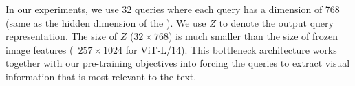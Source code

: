 In our experiments,
we use 32 queries where each query has a dimension of 768 (same as the hidden dimension of the \name).
We use $Z$ to denote the output query representation.
The size of $Z$ ($32\times768$) is much smaller than the size of frozen image features (\eg~$257\times1024$ for ViT-L/14).
This bottleneck architecture works together with our pre-training objectives into forcing the queries to extract visual information that is most relevant to the text.





\vspace{-0.5ex}
